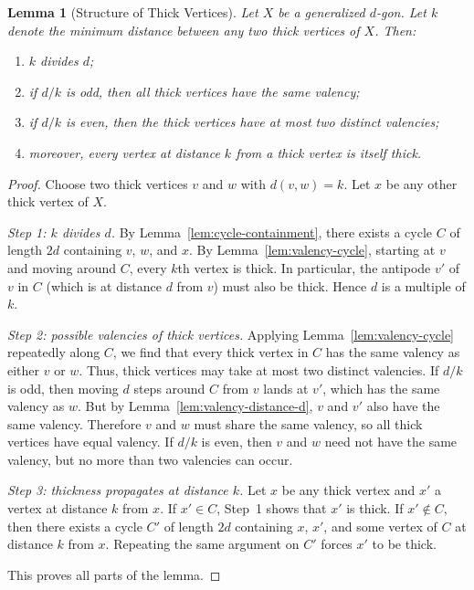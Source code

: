 \documentclass[12pt,a4paper,openany]{book}
\newtheorem{lemma}{Lemma}[section]
\begin{document}
\begin{lemma}[Structure of Thick Vertices]\label{lem:thick-structure}
Let $X$ be a generalized $d$-gon. Let $k$ denote the minimum distance between any two thick vertices of $X$. Then:
\begin{enumerate}
    \item $k$ divides $d$;
    \item if $d/k$ is odd, then all thick vertices have the same valency;
    \item if $d/k$ is even, then the thick vertices have at most two distinct valencies;
    \item moreover, every vertex at distance $k$ from a thick vertex is itself thick.
\end{enumerate}
\end{lemma}

\begin{proof}
Choose two thick vertices $v$ and $w$ with $d(v,w)=k$. Let $x$ be any other thick vertex of $X$.  

\smallskip
\emph{Step 1: $k$ divides $d$.}  
By Lemma~\ref{lem:cycle-containment}, there exists a cycle $C$ of length $2d$ containing $v$, $w$, and $x$.  
By Lemma~\ref{lem:valency-cycle}, starting at $v$ and moving around $C$, every $k$th vertex is thick. In particular, the antipode $v'$ of $v$ in $C$ (which is at distance $d$ from $v$) must also be thick. Hence $d$ is a multiple of $k$.

\smallskip
\emph{Step 2: possible valencies of thick vertices.}  
Applying Lemma~\ref{lem:valency-cycle} repeatedly along $C$, we find that every thick vertex in $C$ has the same valency as either $v$ or $w$. Thus, thick vertices may take at most two distinct valencies.  
If $d/k$ is odd, then moving $d$ steps around $C$ from $v$ lands at $v'$, which has the same valency as $w$. But by Lemma~\ref{lem:valency-distance-d}, $v$ and $v'$ also have the same valency. Therefore $v$ and $w$ must share the same valency, so all thick vertices have equal valency.  
If $d/k$ is even, then $v$ and $w$ need not have the same valency, but no more than two valencies can occur.

\smallskip
\emph{Step 3: thickness propagates at distance $k$.}  
Let $x$ be any thick vertex and $x'$ a vertex at distance $k$ from $x$.  
If $x'\in C$, Step~1 shows that $x'$ is thick.  
If $x'\notin C$, then there exists a cycle $C'$ of length $2d$ containing $x$, $x'$, and some vertex of $C$ at distance $k$ from $x$. Repeating the same argument on $C'$ forces $x'$ to be thick.

\smallskip
This proves all parts of the lemma.
\end{proof}
\end{document}
